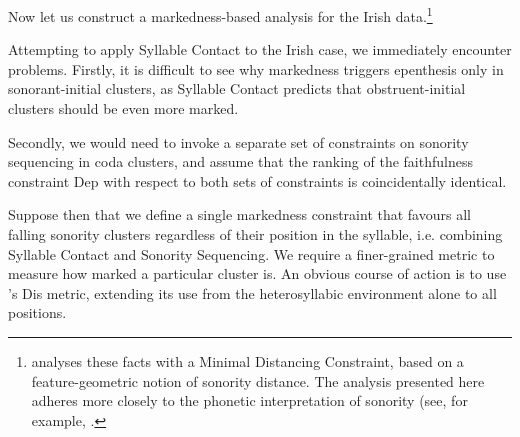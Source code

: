 \documentclass[12pt]{article}
\begin{document}
%
%
%


Now let us construct a markedness-based analysis for the Irish data.\footnote{\cite{carnie.1994} analyses these facts with a Minimal Distancing Constraint, based on a feature-geometric notion of sonority distance. The analysis presented here adheres more closely to the phonetic interpretation of sonority (see, for example, \cite{parker.2002}.}

Attempting to apply Syllable Contact to the Irish case, we immediately encounter problems. Firstly, it is difficult to see why markedness triggers epenthesis only in sonorant-initial clusters, as Syllable Contact predicts that obstruent-initial clusters should be even more marked.

Secondly, we would need to invoke a separate set of constraints on sonority sequencing in coda clusters, and assume that the ranking of the faithfulness constraint {\sc Dep} with respect to both sets of constraints is coincidentally identical.

Suppose then that we define a single markedness constraint that favours all falling sonority clusters regardless of their position in the syllable, i.e. combining Syllable Contact and Sonority Sequencing. We require a finer-grained metric to measure how marked a particular cluster is. An obvious course of action is to use \citet{gouskova.2002}'s {\sc Dis} metric, extending its use from the heterosyllabic environment alone to all positions. 
\end{document}
